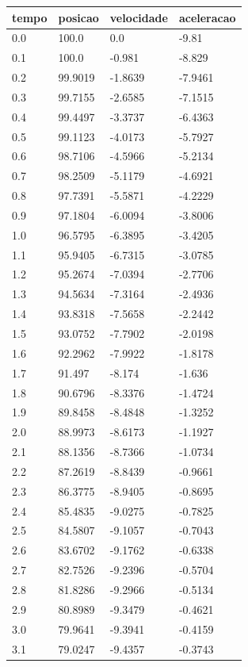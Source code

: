 \begin{tabular}{llll}
\toprule
tempo & posicao & velocidade & aceleracao \\
\midrule
0.0 & 100.0 & 0.0 & -9.81 \\
0.1 & 100.0 & -0.981 & -8.829 \\
0.2 & 99.9019 & -1.8639 & -7.9461 \\
0.3 & 99.7155 & -2.6585 & -7.1515 \\
0.4 & 99.4497 & -3.3737 & -6.4363 \\
0.5 & 99.1123 & -4.0173 & -5.7927 \\
0.6 & 98.7106 & -4.5966 & -5.2134 \\
0.7 & 98.2509 & -5.1179 & -4.6921 \\
0.8 & 97.7391 & -5.5871 & -4.2229 \\
0.9 & 97.1804 & -6.0094 & -3.8006 \\
1.0 & 96.5795 & -6.3895 & -3.4205 \\
1.1 & 95.9405 & -6.7315 & -3.0785 \\
1.2 & 95.2674 & -7.0394 & -2.7706 \\
1.3 & 94.5634 & -7.3164 & -2.4936 \\
1.4 & 93.8318 & -7.5658 & -2.2442 \\
1.5 & 93.0752 & -7.7902 & -2.0198 \\
1.6 & 92.2962 & -7.9922 & -1.8178 \\
1.7 & 91.497 & -8.174 & -1.636 \\
1.8 & 90.6796 & -8.3376 & -1.4724 \\
1.9 & 89.8458 & -8.4848 & -1.3252 \\
2.0 & 88.9973 & -8.6173 & -1.1927 \\
2.1 & 88.1356 & -8.7366 & -1.0734 \\
2.2 & 87.2619 & -8.8439 & -0.9661 \\
2.3 & 86.3775 & -8.9405 & -0.8695 \\
2.4 & 85.4835 & -9.0275 & -0.7825 \\
2.5 & 84.5807 & -9.1057 & -0.7043 \\
2.6 & 83.6702 & -9.1762 & -0.6338 \\
2.7 & 82.7526 & -9.2396 & -0.5704 \\
2.8 & 81.8286 & -9.2966 & -0.5134 \\
2.9 & 80.8989 & -9.3479 & -0.4621 \\
3.0 & 79.9641 & -9.3941 & -0.4159 \\
3.1 & 79.0247 & -9.4357 & -0.3743 \\

\end{tabular}
